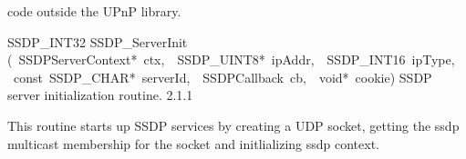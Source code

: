 \documentclass{article}
\begin{document}
\begin{cxxentry}
\begin{cxxentry}
\begin{cxxdoc}
code outside the UPnP library. 
\end{cxxdoc}
\begin{cxxfunction}
{SSDP\_INT32}
        {SSDP\_ServerInit}
        {(\ SSDPServerContext*\ ctx,\ \ SSDP\_UINT8*\ ipAddr,\ \ SSDP\_INT16\ ipType,\ \ const\ SSDP\_CHAR*\ serverId,\ \ SSDPCallback\ cb,\ \ void*\ cookie)}
        {SSDP server initialization routine. }
        {2.1.1}
\begin{cxxdoc}
This routine starts up SSDP services by creating a UDP socket, getting the ssdp
multicast membership for the socket and initlializing ssdp context.



\end{cxxdoc}
\end{cxxfunction}
\end{cxxentry}
\end{cxxentry}
\end{document}
